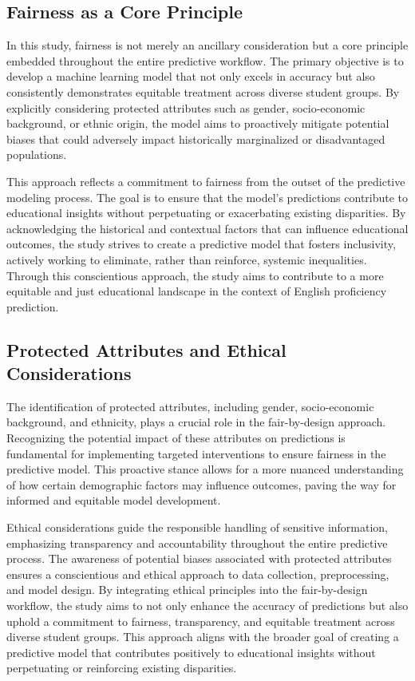 \documentclass[12pt,a4paper,openright,twoside]{book}
\begin{document}
\subsection{Fairness as a Core Principle}

In this study, fairness is not merely an ancillary consideration but a core principle embedded throughout the entire predictive workflow. The primary objective is to develop a machine learning model that not only excels in accuracy but also consistently demonstrates equitable treatment across diverse student groups. By explicitly considering protected attributes such as gender, socio-economic background, or ethnic origin, the model aims to proactively mitigate potential biases that could adversely impact historically marginalized or disadvantaged populations.

This approach reflects a commitment to fairness from the outset of the predictive modeling process. The goal is to ensure that the model's predictions contribute to educational insights without perpetuating or exacerbating existing disparities. By acknowledging the historical and contextual factors that can influence educational outcomes, the study strives to create a predictive model that fosters inclusivity, actively working to eliminate, rather than reinforce, systemic inequalities. Through this conscientious approach, the study aims to contribute to a more equitable and just educational landscape in the context of English proficiency prediction.

\subsection{Protected Attributes and Ethical Considerations}

The identification of protected attributes, including gender, socio-economic background, and ethnicity, plays a crucial role in the fair-by-design approach. Recognizing the potential impact of these attributes on predictions is fundamental for implementing targeted interventions to ensure fairness in the predictive model. This proactive stance allows for a more nuanced understanding of how certain demographic factors may influence outcomes, paving the way for informed and equitable model development.

Ethical considerations guide the responsible handling of sensitive information, emphasizing transparency and accountability throughout the entire predictive process. The awareness of potential biases associated with protected attributes ensures a conscientious and ethical approach to data collection, preprocessing, and model design. By integrating ethical principles into the fair-by-design workflow, the study aims to not only enhance the accuracy of predictions but also uphold a commitment to fairness, transparency, and equitable treatment across diverse student groups. This approach aligns with the broader goal of creating a predictive model that contributes positively to educational insights without perpetuating or reinforcing existing disparities.
\end{document}
